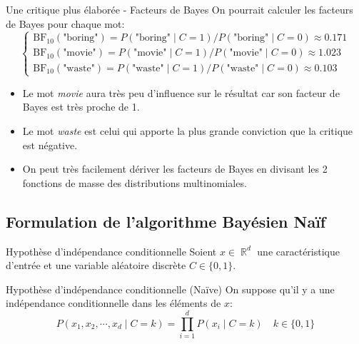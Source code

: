\documentclass[10pt]{beamer}  %
\newcommand{\R}{\operatorname{\mathbb{R}}}
\begin{document}
\begin{frame}{Une critique plus élaborée - Facteurs de Bayes}
	On pourrait calculer les facteurs de Bayes pour chaque mot:
	\begin{equation}
		\begin{cases}
			\text{BF}_{10}(\text{"boring"}) = P(\text{"boring"} \mid C = 1) / P(\text{"boring"} \mid C = 0) \approx 0.171 \\
			\text{BF}_{10}(\text{"movie"}) = P(\text{"movie"} \mid C = 1) / P(\text{"movie"} \mid C = 0) \approx 1.023 \\
			\text{BF}_{10}(\text{"waste"}) = P(\text{"waste"} \mid C = 1) / P(\text{"waste"} \mid C = 0) \approx 0.103
		\end{cases}
		\nonumber
	\end{equation}
	\pause
	\begin{itemize}
		\item Le mot \textit{movie} aura très peu d'influence sur le résultat car son facteur de Bayes est très proche de 1.
		\item Le mot \textit{waste} est celui qui apporte la plus grande conviction que la critique est négative.
		\item On peut très facilement dériver les facteurs de Bayes en divisant les 2 fonctions de masse des distributions multinomiales.
	\end{itemize}
\end{frame}

\subsection[Formulation de l'algorithme Bayésien Naïf]{Formulation de l'algorithme Bayésien Naïf}

\begin{frame}{Hypothèse d'indépendance conditionnelle}
	Soient $x \in \R^d$ une caractéristique d'entrée et une variable aléatoire discrète $C \in \{0, 1\}$.
	\vspace{0.3cm}
	\begin{block}{Hypothèse d'indépendance conditionnelle (Naïve)}
		On suppose qu'il y a une indépendance conditionnelle dans les éléments de $x$:
		\begin{equation}
			P(x_1, x_2, \cdots, x_d \mid C = k) = \prod_{i=1}^{d} P(x_i \mid C = k) \quad k \in \{0, 1\}
			\nonumber
		\end{equation}
	\end{block}
\end{frame}
\end{document}
